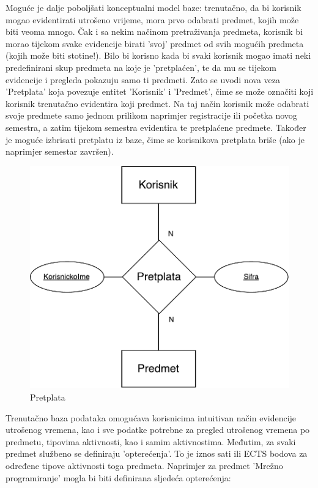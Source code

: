 \documentclass[times, utf8, zavrsni]{fer}
\begin{document}
Moguće je dalje poboljšati konceptualni model baze: trenutačno, da bi korisnik mogao evidentirati utrošeno vrijeme, mora prvo odabrati predmet, kojih može biti veoma mnogo. Čak i sa nekim načinom pretraživanja predmeta, korisnik bi morao tijekom svake evidencije birati 'svoj' predmet od svih mogućih predmeta (kojih može biti stotine!). Bilo bi korisno kada bi svaki korisnik mogao imati neki predefinirani skup predmeta na koje je 'pretplaćen', te da mu se tijekom evidencije i pregleda pokazuju samo ti predmeti. Zato se uvodi nova veza 'Pretplata' koja povezuje entitet 'Korisnik' i 'Predmet', čime se može označiti koji korisnik trenutačno evidentira koji predmet. Na taj način korisnik može odabrati svoje predmete samo jednom prilikom naprimjer registracije ili početka novog semestra, a zatim tijekom semestra evidentira te pretplaćene predmete. Također je moguće izbrisati pretplatu iz baze, čime se korisnikova pretplata briše (ako je naprimjer semestar završen).\\

\begin{figure}[H]
\centering
\includegraphics[width=\textwidth,height=\textheight,keepaspectratio]{img/pretplata.pdf}
\caption{Pretplata}
\label{fig:pretplata}
\end{figure}

Trenutačno baza podataka omogućava korisnicima intuitivan način evidencije utrošenog vremena, kao i sve podatke potrebne za pregled utrošenog vremena po predmetu, tipovima aktivnosti, kao i samim aktivnostima. Međutim, za svaki predmet službeno se definiraju 'opterećenja'. To je iznos sati ili ECTS bodova za određene tipove aktivnosti toga predmeta. Naprimjer za predmet 'Mrežno programiranje' mogla bi biti definirana sljedeća opterećenja:\\
\end{document}

